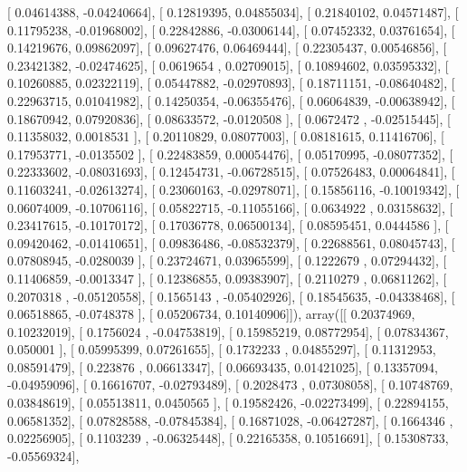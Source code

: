 \documentclass{article}
\begin{document}
       [ 0.04614388, -0.04240664],
       [ 0.12819395,  0.04855034],
       [ 0.21840102,  0.04571487],
       [ 0.11795238, -0.01968002],
       [ 0.22842886, -0.03006144],
       [ 0.07452332,  0.03761654],
       [ 0.14219676,  0.09862097],
       [ 0.09627476,  0.06469444],
       [ 0.22305437,  0.00546856],
       [ 0.23421382, -0.02474625],
       [ 0.0619654 ,  0.02709015],
       [ 0.10894602,  0.03595332],
       [ 0.10260885,  0.02322119],
       [ 0.05447882, -0.02970893],
       [ 0.18711151, -0.08640482],
       [ 0.22963715,  0.01041982],
       [ 0.14250354, -0.06355476],
       [ 0.06064839, -0.00638942],
       [ 0.18670942,  0.07920836],
       [ 0.08633572, -0.0120508 ],
       [ 0.0672472 , -0.02515445],
       [ 0.11358032,  0.0018531 ],
       [ 0.20110829,  0.08077003],
       [ 0.08181615,  0.11416706],
       [ 0.17953771, -0.0135502 ],
       [ 0.22483859,  0.00054476],
       [ 0.05170995, -0.08077352],
       [ 0.22333602, -0.08031693],
       [ 0.12454731, -0.06728515],
       [ 0.07526483,  0.00064841],
       [ 0.11603241, -0.02613274],
       [ 0.23060163, -0.02978071],
       [ 0.15856116, -0.10019342],
       [ 0.06074009, -0.10706116],
       [ 0.05822715, -0.11055166],
       [ 0.0634922 ,  0.03158632],
       [ 0.23417615, -0.10170172],
       [ 0.17036778,  0.06500134],
       [ 0.08595451,  0.0444586 ],
       [ 0.09420462, -0.01410651],
       [ 0.09836486, -0.08532379],
       [ 0.22688561,  0.08045743],
       [ 0.07808945, -0.0280039 ],
       [ 0.23724671,  0.03965599],
       [ 0.1222679 ,  0.07294432],
       [ 0.11406859, -0.0013347 ],
       [ 0.12386855,  0.09383907],
       [ 0.2110279 ,  0.06811262],
       [ 0.2070318 , -0.05120558],
       [ 0.1565143 , -0.05402926],
       [ 0.18545635, -0.04338468],
       [ 0.06518865, -0.0748378 ],
       [ 0.05206734,  0.10140906]]), array([[ 0.20374969,  0.10232019],
       [ 0.1756024 , -0.04753819],
       [ 0.15985219,  0.08772954],
       [ 0.07834367,  0.050001  ],
       [ 0.05995399,  0.07261655],
       [ 0.1732233 ,  0.04855297],
       [ 0.11312953,  0.08591479],
       [ 0.223876  ,  0.06613347],
       [ 0.06693435,  0.01421025],
       [ 0.13357094, -0.04959096],
       [ 0.16616707, -0.02793489],
       [ 0.2028473 ,  0.07308058],
       [ 0.10748769,  0.03848619],
       [ 0.05513811,  0.0450565 ],
       [ 0.19582426, -0.02273499],
       [ 0.22894155,  0.06581352],
       [ 0.07828588, -0.07845384],
       [ 0.16871028, -0.06427287],
       [ 0.1664346 ,  0.02256905],
       [ 0.1103239 , -0.06325448],
       [ 0.22165358,  0.10516691],
       [ 0.15308733, -0.05569324],
\end{document}

